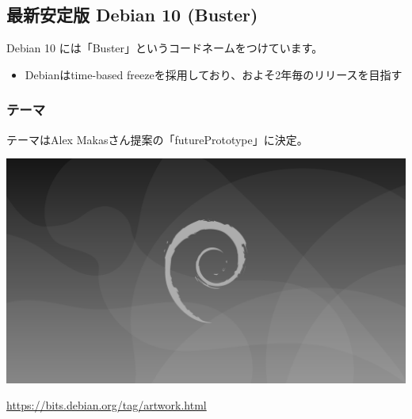 \documentclass[mingoth,a4paper]{jsarticle}
\begin{document}

\subsection{最新安定版 Debian 10 (Buster)}


Debian 10 には「Buster」というコードネームをつけています。

\begin{itemize}
\item Debianはtime-based freezeを採用しており、およそ2年毎のリリースを目指す
\end{itemize}
  \begin{center}
  \end{center}



\subsubsection{テーマ}



テーマはAlex Makasさん提案の「futurePrototype」に決定。
  
\begin{center}
  \includegraphics[width=0.75\hsize]{image201902/futurePrototype-wallpaper-1920x1080_gray.png}
\end{center}

\url{https://bits.debian.org/tag/artwork.html}
\end{document}
